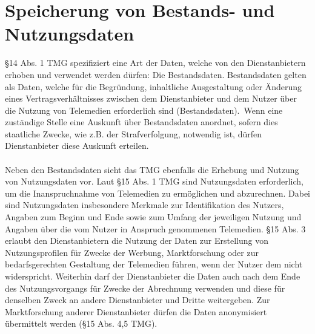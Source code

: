 \section{Speicherung von Bestands- und Nutzungsdaten}
\S 14 Abs. 1 TMG spezifiziert eine Art der Daten, welche von den Dienstanbietern erhoben und verwendet werden dürfen: Die Bestandsdaten. Bestandsdaten gelten als Daten, welche \glqq für die Begründung, inhaltliche Ausgestaltung oder Änderung eines Vertragsverhältnisses zwischen dem Dienstanbieter und dem Nutzer über die Nutzung von Telemedien erforderlich sind (Bestandsdaten).\grqq \ Wenn eine zuständige Stelle eine Auskunft über Bestandsdaten anordnet, sofern dies staatliche Zwecke, wie z.B. der Strafverfolgung, notwendig ist, dürfen Dienstanbieter diese Auskunft erteilen.\\
\\Neben den Bestandsdaten sieht das TMG ebenfalls die Erhebung und Nutzung von Nutzungsdaten vor. Laut \S 15 Abs. 1 TMG sind Nutzungsdaten erforderlich, um die Inanspruchnahme von Telemedien zu ermöglichen und abzurechnen. Dabei sind Nutzungsdaten insbesondere Merkmale zur Identifikation des Nutzers, Angaben zum Beginn und Ende sowie zum Umfang der jeweiligen Nutzung und Angaben über die vom Nutzer in Anspruch genommenen Telemedien. \S 15 Abs. 3 erlaubt den Dienstanbietern die Nutzung der Daten zur Erstellung von Nutzungsprofilen für Zwecke der Werbung, Marktforschung oder zur bedarfsgerechten Gestaltung der Telemedien führen, wenn der Nutzer dem nicht widerspricht. Weiterhin darf der Dienstanbieter die Daten auch nach dem Ende des Nutzungsvorgangs für Zwecke der Abrechnung verwenden und diese für denselben Zweck an andere Dienstanbieter und Dritte weitergeben. Zur Marktforschung anderer Dienstanbieter dürfen die Daten anonymisiert übermittelt werden (\S 15 Abs. 4,5 TMG).\\

